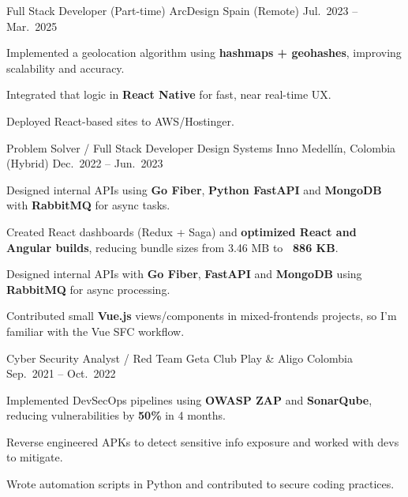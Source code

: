 \begin{cventries}
  \cventry
  {Full Stack Developer (Part-time)}
  {ArcDesign}
  {Spain (Remote)}
  {Jul.\ 2023 -- Mar.\ 2025}
  {
    \begin{cvitems}
      \item {Implemented a geolocation algorithm using \textbf{hashmaps + geohashes}, improving scalability and accuracy.}
      \item {Integrated that logic in \textbf{React Native} for fast, near real-time UX.}
      \item {Deployed React-based sites to AWS/Hostinger.}
    \end{cvitems}
  }

  \cventry
  {Problem Solver / Full Stack Developer}
  {Design Systems Inno}
  {Medellín, Colombia (Hybrid)}
  {Dec.\ 2022 -- Jun.\ 2023}
  {
    \begin{cvitems}
      \item {Designed internal APIs using \textbf{Go Fiber}, \textbf{Python FastAPI} and \textbf{MongoDB} with \textbf{RabbitMQ} for async tasks.}
      \item {Created React dashboards (Redux + Saga) and \textbf{optimized React and Angular builds}, reducing bundle sizes from 3.46 MB to \textbf{~886 KB}.}
      \item {Designed internal APIs with \textbf{Go Fiber}, \textbf{FastAPI} and \textbf{MongoDB} using \textbf{RabbitMQ} for async processing.}
      \item \item {Contributed small \textbf{Vue.js} views/components in mixed-frontends projects, so I’m familiar with the Vue SFC workflow.}
    \end{cvitems}
  }

  \cventry
  {Cyber Security Analyst / Red Team}
  {Geta Club Play \& Aligo}
  {Colombia}
  {Sep.\ 2021 -- Oct.\ 2022}
  {
    \begin{cvitems}
      \item {Implemented DevSecOps pipelines using \textbf{OWASP ZAP} and \textbf{SonarQube}, reducing vulnerabilities by \textbf{50\%} in 4 months.}
      \item {Reverse engineered APKs to detect sensitive info exposure and worked with devs to mitigate.}
      \item {Wrote automation scripts in Python and contributed to secure coding practices.}
    \end{cvitems}
  }

\end{cventries}
